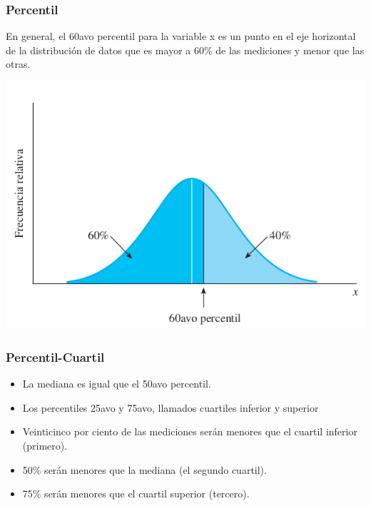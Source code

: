 \documentclass[spanish]{beamer}
\begin{document}
\begin{frame}
\frametitle{Percentil}
En general, el 60avo percentil para la variable x es un punto en el eje horizontal de la distribución de datos que es mayor a 60\% de las mediciones y menor que las otras.

\begin{center}
\includegraphics[scale=0.4]{im25}
\end{center}

\end{frame}
\begin{frame}
\frametitle{Percentil-Cuartil}

\begin{itemize}
\item La mediana es igual que el 50avo percentil.
\item Los percentiles 25avo y 75avo, llamados cuartiles inferior y superior
\item Veinticinco por ciento de las mediciones serán menores que el cuartil inferior (primero).
\item 50\% serán menores que la mediana (el segundo cuartil).
\item 75\% serán menores que el cuartil superior (tercero).
\end{itemize}

\end{frame}
\end{document}
